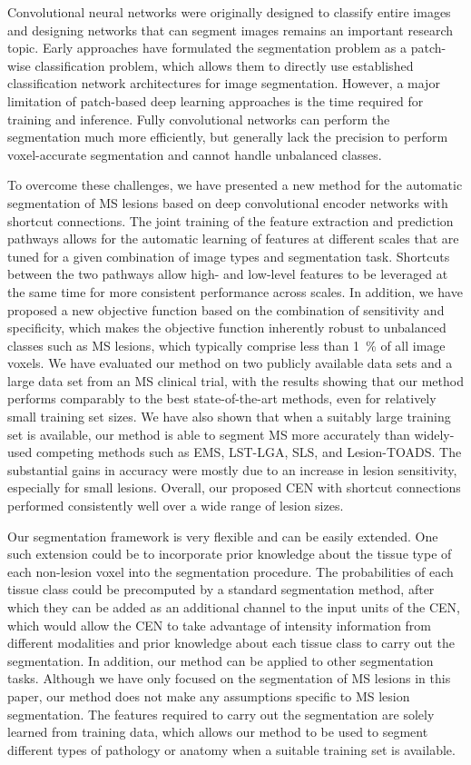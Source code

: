 Convolutional neural networks were originally designed to classify entire images
and designing networks that can segment images remains an important research
topic. Early approaches have formulated the segmentation problem as a patch-wise
classification problem, which allows them to directly use established
classification network architectures for image segmentation.
However, a major limitation of patch-based deep learning approaches is the time
required for training and inference. Fully convolutional networks can perform
the segmentation much more efficiently, but generally lack the precision to
perform voxel-accurate segmentation and cannot handle unbalanced classes.

To overcome these challenges, we have presented a new method for the automatic
segmentation of MS lesions based on deep convolutional encoder networks with
shortcut connections. The joint training of the feature extraction and
prediction pathways allows for the automatic learning of features at different
scales that are tuned for a given combination of image types and segmentation
task. Shortcuts between the two pathways allow high- and low-level features to
be leveraged at the same time for more consistent performance across scales. In
addition, we have proposed a new objective function based on the combination of
sensitivity and specificity, which makes the objective function inherently
robust to unbalanced classes such as MS lesions, which typically comprise less
than \SI{1}{\percent} of all image voxels. We have evaluated our method on two
publicly available data sets and a large data set from an MS clinical trial,
with the results showing that our method performs comparably to the best
state-of-the-art methods, even for relatively small training set sizes. We have
also shown that when a suitably large training set is available, our method is
able to segment MS more accurately than widely-used competing methods such as
EMS, LST-LGA, SLS, and Lesion-TOADS. The substantial gains in accuracy were
mostly due to an increase in lesion sensitivity, especially for small lesions.
Overall, our proposed CEN with shortcut connections performed consistently well
over a wide range of lesion sizes.

Our segmentation framework is very flexible and can be easily extended. One such
extension could be to incorporate prior knowledge about the tissue type of each
non-lesion voxel into the segmentation procedure. The probabilities of each
tissue class could be precomputed by a standard segmentation method, after which
they can be added as an additional channel to the input units of the CEN, which
would allow the CEN to take advantage of intensity information from different
modalities and prior knowledge about each tissue class to carry out the
segmentation. In addition, our method can be applied to other segmentation
tasks. Although we have only focused on the segmentation of MS lesions in this
paper, our method does not make any assumptions specific to MS lesion
segmentation. The features required to carry out the segmentation are solely
learned from training data, which allows our method to be used to segment
different types of pathology or anatomy when a suitable training set is
available.
